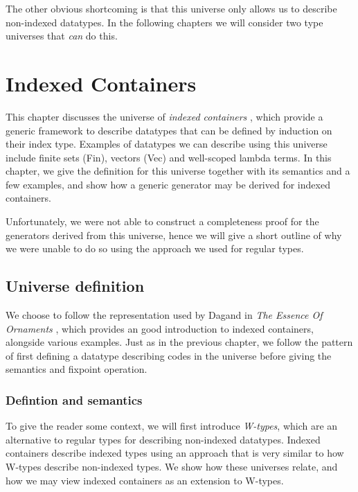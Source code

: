 \documentclass[a4paper,msc,twosized=semi]{uustthesis}
\let\oldemph\emph
\renewcommand\emph[1]{{\large\oldemph{#1}}}
\newcommand{\agda}[1]{{\agdafontinline\color{agdacolor}#1}}
\newcommand{\includeagda}[2]{\vspace*{-0.25cm}\begin{center}{\fontsize{12}{14}\agdafont\ExecuteMetaData[../src/chap0#1/latex/code.tex]{#2}}\end{center}\vspace*{-0.25cm}}
\begin{document}
\includeagda{5}{defrose}

  The other obvious shortcoming is that this universe only allows us to describe 
  non-indexed datatypes. In the following chapters we will consider two type 
  universes that \emph{can} do this. 

\chapter{Indexed Containers}
  This chapter discusses the universe of \emph{indexed containers} \cite
  {altenkirch2015indexed}, which provide a generic framework to describe datatypes 
  that can be defined by induction on their index type. Examples of datatypes we can 
  describe using this universe include finite sets (\agda{Fin}), vectors (\agda{Vec}) and 
  well-scoped lambda terms. In this chapter, we give the definition for this universe 
  together with its semantics and a few examples, and show how a generic generator may 
  be derived for indexed containers. 

  Unfortunately, we were not able to construct a completeness proof for the generators 
  derived from this universe, hence we will give a short outline of why we were unable 
  to do so using the approach we used for regular types. 

\section{Universe definition}

  We choose to follow the representation used by Dagand in \emph{The Essence Of 
  Ornaments} \cite{dagand2017essence}, which provides an good introduction to indexed 
  containers, alongside various examples. Just as in the previous chapter, we follow 
  the pattern of first defining a datatype describing codes in the universe before 
  giving the semantics and fixpoint operation. 

\subsection{Defintion and semantics}

  To give the reader some context, we will first introduce \emph{W-types}, which are 
  an alternative to regular types for describing non-indexed datatypes. Indexed 
  containers describe indexed types using an approach that is very similar to how 
  W-types describe non-indexed types. We show how these universes relate, and how we 
  may view indexed containers as an extension to W-types. 
\end{document}
